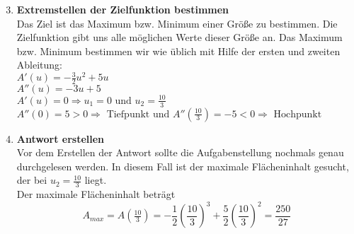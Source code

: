 \begin{enumerate}
	\setcounter{enumi}{2}
	\item \textbf{Extremstellen der Zielfunktion bestimmen}\\
	\textcolor{loes}{Das Ziel ist das Maximum bzw. Minimum einer Größe zu bestimmen. Die Zielfunktion gibt uns alle möglichen Werte dieser Größe an. Das Maximum bzw. Minimum bestimmen wir wie üblich mit Hilfe der ersten und zweiten Ableitung:}\\
	\textcolor{loes}{\(A'(u)=-\frac{3}{2}u^2+5u\)}\\
	\textcolor{loes}{\(A''(u)=-3u+5\)}\\
	\textcolor{loes}{\(A'(u)=0\Rightarrow u_1=0\text{ und }u_2=\frac{10}{3}\)}\\	
	\textcolor{loes}{\(A''(0)=5>0\Rightarrow\text{ Tiefpunkt und }A''\left(\frac{10}{3}\right)=-5<0\Rightarrow\text{ Hochpunkt}\)}
	\item \textbf{Antwort erstellen}\\
	\textcolor{loes}{Vor dem Erstellen der Antwort sollte die Aufgabenstellung nochmals genau durchgelesen werden. In diesem Fall ist der maximale Flächeninhalt gesucht, der bei \(u_2=\frac{10}{3}\) liegt.}\\
	\textcolor{loes}{Der maximale Flächeninhalt beträgt}\\
	\textcolor{loes}{\[A_{max}=A\left(\tfrac{10}{3}\right)=-\frac{1}{2}\left(\frac{10}{3}\right)^3+\frac{5}{2}\left(\frac{10}{3}\right)^2=\frac{250}{27}\]}
\end{enumerate}

